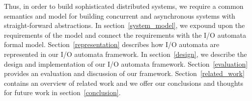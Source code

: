 \documentclass[letterpaper]{article}
\begin{document}
Thus, in order to build sophisticated distributed systems, we require a common semantics and model for building concurrent and asynchronous systems with straight-forward abstractions.
In section~\ref{system_model}, we expound upon the requirements of the model and connect the requirements with the I/O automata formal model.
Section~\ref{representation} describes how I/O automata are represented in our I/O automata framework.
In section~\ref{design}, we describe the design and implementation of our I/O automata framework.
Section~\ref{evaluation} provides an evaluation and discussion of our framework.
Section~\ref{related_work} contains an overview of related work and we offer our conclusions and thoughts for future work in section~\ref{conclusion}.







\end{document}
